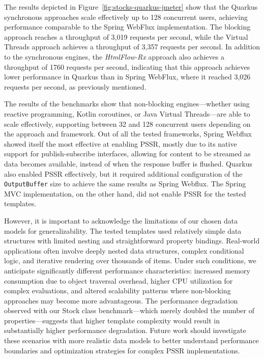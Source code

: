 The results depicted in Figure~\ref{fig:stocks-quarkus-jmeter} show that the
Quarkus synchronous approaches scale effectively up to 128 concurrent users,
achieving performance comparable to the Spring WebFlux implementation. The
blocking approach reaches a throughput of 3,019 requests per second, while the
Virtual Threads approach achieves a throughput of 3,357 requests per second. In
addition to the synchronous engines, the \textit{HtmlFlow-Rx} approach also
achieves a throughput of 1760 requests per second, indicating that this
approach achieves lower performance in Quarkus than in Spring WebFlux, where it
reached 3,026 requests per second, as previously mentioned.

The results of the benchmarks show that non-blocking engines—whether using
reactive programming, Kotlin coroutines, or Java Virtual Threads—are able to
scale effectively, supporting between 32 and 128 concurrent users depending on
the approach and framework. Out of all the tested frameworks, Spring Webflux
showed itself the most effective at enabling PSSR, mostly due to its native
support for publish-subscribe interfaces, allowing for content to be streamed
as data becomes available, instead of when the response buffer is flushed.
Quarkus also enabled PSSR effectively, but it required additional configuration
of the \texttt{OutputBuffer} size to achieve the same results as Spring
Webflux. The Spring MVC implementation, on the other hand, did not enable PSSR
for the tested templates.

However, it is important to acknowledge the limitations of our chosen data
models for generalizability. The tested templates used relatively simple data
structures with limited nesting and straightforward property bindings.
Real-world applications often involve deeply nested data structures, complex
conditional logic, and iterative rendering over thousands of items. Under such
conditions, we anticipate significantly different performance characteristics:
increased memory consumption due to object traversal overhead, higher CPU
utilization for complex evaluations, and altered scalability patterns where
non-blocking approaches may become more advantageous. The performance
degradation observed with our Stock class benchmark—which merely doubled the
number of properties—suggests that higher template complexity would result in
substantially higher performance degradation. Future work should investigate
these scenarios with more realistic data models to better understand
performance boundaries and optimization strategies for complex PSSR
implementations.

